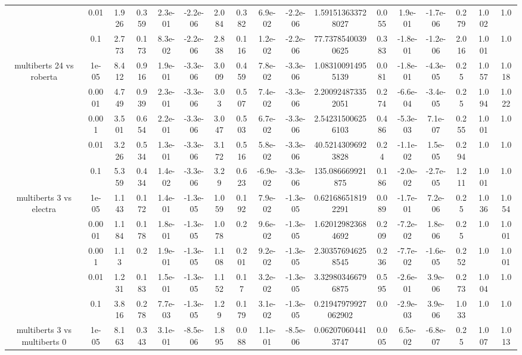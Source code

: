 \begin{tabular}{|c|c|c|c|c|c|c|c|c|c|c|c|c|c|c|c|c|}
 & 0.01 & 1.926 & 0.359 & 2.3e-01 & -2.2e-06 & 2.084 & 0.382 & 6.9e-02 & -2.2e-06 & 1.591513633728027 & 0.055 & 1.9e-01 & -1.7e-06 & 0.279 & 1.002 & 1.0 \\
 & 0.1 & 2.773 & 0.173 & 8.3e-02 & -2.2e-06 & 2.838 & 0.116 & 1.2e-02 & -2.2e-06 & 77.73785400390625 & 0.383 & -1.8e-01 & -1.2e-06 & 2.016 & 1.001 & 1.0 \\
\hline
\multirow{5}{*}{multiberts 24 vs roberta } & 1e-05 & 8.412 & 0.916 & 1.9e-01 & -3.3e-06 & 3.009 & 0.459 & 7.8e-02 & -3.3e-06 & 1.083100914955139 & 0.081 & -1.8e-01 & -4.3e-05 & 0.25 & 1.057 & 1.018 \\
 & 0.0001 & 4.749 & 0.939 & 2.3e-01 & -3.3e-06 & 3.03 & 0.507 & 7.4e-02 & -3.3e-06 & 2.200924873352051 & 0.274 & -6.6e-04 & -3.4e-05 & 0.25 & 1.094 & 1.022 \\
 & 0.001 & 3.501 & 0.654 & 2.2e-01 & -3.3e-06 & 3.047 & 0.503 & 6.7e-02 & -3.3e-06 & 2.542315006256103 & 0.486 & -5.3e-03 & 7.1e-07 & 0.255 & 1.001 & 1.0 \\
 & 0.01 & 3.226 & 0.534 & 1.3e-01 & -3.3e-06 & 3.172 & 0.516 & 5.8e-02 & -3.3e-06 & 40.52143096923828 & 0.24 & -1.1e-02 & 1.5e-05 & 0.294 & 1.0 & 1.0 \\
 & 0.1 & 5.359 & 0.434 & 1.4e-02 & -3.3e-06 & 3.29 & 0.623 & -6.9e-02 & -3.3e-06 & 135.086669921875 & 0.186 & -2.0e-02 & -2.7e-05 & 1.211 & 1.001 & 1.0 \\
\hline
\multirow{5}{*}{multiberts 3 vs electra } & 1e-05 & 1.143 & 0.172 & 1.4e-01 & -1.3e-05 & 1.059 & 0.192 & 7.9e-02 & -1.3e-05 & 0.621686518192291 & 0.089 & -1.7e-01 & 7.2e-06 & 0.25 & 1.036 & 1.054 \\
 & 0.0001 & 1.184 & 0.178 & 1.8e-01 & -1.3e-05 & 1.078 & 0.2 & 9.6e-02 & -1.3e-05 & 1.620129823684692 & 0.209 & -7.2e-02 & 1.8e-06 & 0.25 & 1.0 & 1.001 \\
 & 0.001 & 1.13 & 0.2 & 1.9e-01 & -1.3e-05 & 1.108 & 0.201 & 9.2e-02 & -1.3e-05 & 2.303576946258545 & 0.236 & -7.7e-02 & -1.6e-05 & 0.252 & 1.0 & 1.001 \\
 & 0.01 & 1.231 & 0.183 & 1.5e-01 & -1.3e-05 & 1.152 & 0.17 & 3.2e-02 & -1.3e-05 & 3.329803466796875 & 0.595 & -2.6e-01 & 3.9e-06 & 0.273 & 1.004 & 1.0 \\
 & 0.1 & 3.816 & 0.278 & 7.7e-03 & -1.3e-05 & 1.29 & 0.179 & 3.1e-02 & -1.3e-05 & 0.21947979927062902 & 0.0 & -2.9e-03 & 3.9e-06 & 1.033 & 1.0 & 1.0 \\
\hline
\multirow{5}{*}{multiberts 3 vs multiberts 0} & 1e-05 & 8.163 & 0.343 & 3.1e-01 & -8.5e-06 & 1.895 & 0.088 & 1.1e-01 & -8.5e-06 & 0.062070604413747 & 0.005 & 6.5e-02 & -6.8e-07 & 0.25 & 1.007 & 1.013 \\

\end{tabular}
